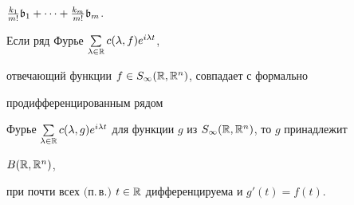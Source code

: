 $\frac{k_1}{m!}\frak b_1+\dotsb+\frac{k_m}{m!}\frak b_m$.








\begin{thms}


Если ряд Фурье $\sum\limits_{\lambda\in\Bbb R}c(\lambda,f)e^{i\lambda t}$,


отвечающий функции $f\in S_{\infty}(\Bbb R,\Bbb R^n)$, совпадает с формально


продифференцированным рядом


Фурье $\sum\limits_{\lambda\in\Bbb R}c(\lambda,g)e^{i\lambda


t}$ для функции $g$ из $S_{\infty}(\Bbb R,\Bbb R^n)$, то $g$ принадлежит


$B(\Bbb R,\Bbb R^n)$,


при почти всех $($п.\,в.$)$ $t\in\Bbb R$ дифференцируема и $g'(t)=f(t)$.


\end{thms}





